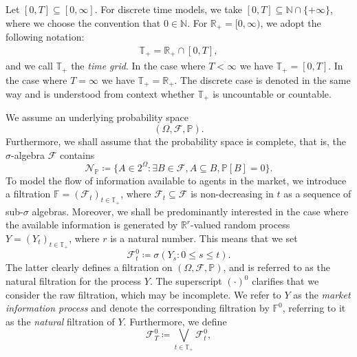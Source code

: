 \documentclass[11pt,a4paper,twoside,openany]{report}
\numberwithin{equation}{section}
\theoremstyle{plain} %
\theoremstyle{definition} %
\theoremstyle{remark} %
\begin{document}
Let \([0,T]\subseteq[0,\infty]\). For discrete time models, we take \([0,T]\subseteq\mathbb{N}\cap\{+\infty\}\), where we choose the convention that \(0\in\mathbb{N}\). For \(\mathbb{R}_+=[0,\infty)\), we adopt the following notation: 
\begin{align*}
    \mathbb{T}_+=\mathbb{R}_+\cap [0,T],
\end{align*}
and we call \(\mathbb{T}_+\) the \textit{time grid}.
In the case where \(T<\infty\) we have \(\mathbb{T}_+=[0,T]\). In the case where \(T=\infty\) we have \(\mathbb{T}_+=\mathbb{R}_+\). The discrete case is denoted in the same way and is understood from context whether \(\mathbb{T}_+\) is uncountable or countable.



We assume an underlying probability space 
\begin{equation*}
    (\Omega,\mathcal{F},\mathbb{P}).
\end{equation*}
Furthermore, we shall assume that the probability space is complete, that is, the \(\sigma\)-algebra \(\mathcal{F}\) contains 
\begin{equation}\label{eq:nullsets}
    \mathcal{N}_{\mathbb{P}}\coloneqq\{A\in2^{\Omega}:\exists B\in\mathcal{F}, A\subseteq B, \mathbb{P}[B]=0\}.
\end{equation} 
To model the flow of information available to agents in the market, we introduce a filtration  \(\mathbb{F}=(\mathcal{F}_t)_{t\in \mathbb{T}_+}\), where
\(\mathcal{F}_t\subseteq\mathcal{F}\) is non-decreasing in \(t\) as a sequence of sub-\(\sigma\) algebras.
Moreover, we shall be predominantly interested in the case where the available information is generated by  \(\mathbb{R}^{r}\)-valued random process \(Y=(Y_t)_{t\in \mathbb{T}_+}\), where \(r\) is a natural number. This means that we set 
\begin{equation*}
    \mathcal{F}^0_t\coloneqq\sigma(Y_s:0\leq s\leq t).
\end{equation*}
The latter clearly defines a filtration on \((\Omega,\mathcal{F},\mathbb{P})\), and is referred to as the natural filtration for the process \(Y\). The superscript \((\cdot)^0\) clarifies that we consider the raw filtration, which may be incomplete. 
We refer to \(Y\) as the \textit{market information process} and denote the corresponding filtration by \(\mathbb{F}^0\), referring to it as the \textit{natural} filtration of \(Y\). Furthermore, we define 
\begin{equation*}
    \mathcal{F}_T^0\coloneqq\bigvee_{t\in\mathbb{T}_+}\mathcal{F}_t^0,
\end{equation*}
\end{document}
